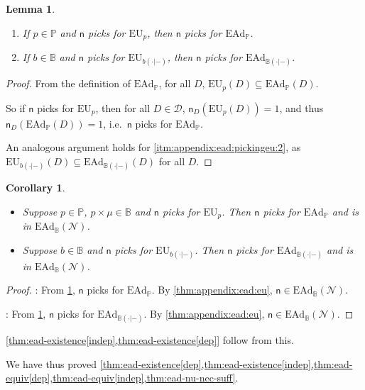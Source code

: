 \documentclass[a4paper]{article}
\newtheorem{lemma}[theorem]{Lemma}
\newtheorem{corollary}[theorem]{Corollary}
\renewcommand\P{\mathbb{P}} %
\newcommand\EU{\mathrm{EU}}
\newcommand\EAd{\mathrm{EAd}}
\newcommand{\Decs}{\mathcal{D}}
\newcommand{\n}{\mathsf{n}}
\renewcommand{\nu}{\n}
\newcommand\Nu{\mathcal{N}}
\newcommand{\IB}{\mathbb{B}}
\newcommand{\IP}{\P}
\renewcommand{\color}[1]{}
\newenvironment{colored}[1]{\leavevmode\color{#1}}{}
\newenvironment{CCM rewritten}
{\begingroup\color{blue}} %
{\endgroup}              %
\begin{document}
\begin{colored}{violet}
\begin{lemma}\label{thm:appendix:ead:pickingeu}
	\begin{enumerate}
		\item\label{itm:appendix:ead:pickingeu:1} If $p\in \IP$ and $\nu$ picks for $\EU_p$, then $\nu$ picks for $\EAd_\IP$.
		\item\label{itm:appendix:ead:pickingeu:2}  If $b\in\IB$ and $\nu$ picks for $\EU_{b(\cdot|-)}$, then $\nu$ picks for $\EAd_{\IB(\cdot|-)}$. 
	\end{enumerate}
\end{lemma}
\begin{proof}
	From the definition of $\EAd_\IP$, for all $D$, $\EU_p(D)\subseteq \EAd_\IP(D)$.
	
	So if $\nu$ picks for $\EU_p$, then for all $D\in\Decs$, $\nu_D(\EU_p(D))=1$, and thus $\nu_D(\EAd_\IP(D))=1$, i.e.~$\nu$ picks for $\EAd_\IP$. 
	
	An analogous argument holds for \cref{itm:appendix:ead:pickingeu:2}, as $\EU_{b(\cdot|-)}(D)\subseteq\EAd_{\IB(\cdot|-)}(D)$ for all $D$. 
\end{proof}

\begin{corollary}\label{thm:appendix:ead:exists}
	\begin{itemize}
		\item \label{itm:ead:blah1}Suppose $p\in\IP$,  $p\times\mu\in\IB$ and $\nu$ picks for $\EU_p$. Then $\nu$ picks for $\EAd_\IP$ and is in $\EAd_\IB(\Nu)$. 
		\item \label{itm:ead:blah2}Suppose $b\in\IB$ and $\nu$ picks for $\EU_{b(\cdot|-)}$. Then $\nu$ picks for $\EAd_{\IB(\cdot|-)}$ and is in $\EAd_\IB(\Nu)$. 
	\end{itemize}
\end{corollary}
\begin{proof}
	: From \cref{thm:appendix:ead:pickingeu}, $\nu$ picks for $\EAd_\IP$. By \cref{thm:appendix:ead:eu}, $\nu\in\EAd_\IB(\Nu)$. 
	
	: From \cref{thm:appendix:ead:pickingeu}, $\nu$ picks for $\EAd_{\IB(\cdot|-)}$. By \cref{thm:appendix:ead:eu}, $\nu\in\EAd_\IB(\Nu)$. 
\end{proof}
\cref{thm:ead-existence[indep],thm:ead-existence[dep]} follow from this.



We have thus proved \cref{thm:ead-existence[dep],thm:ead-existence[indep],thm:ead-equiv[dep],thm:ead-equiv[indep],thm:ead-nu-nec-suff}. 



\end{colored}
\end{document}
